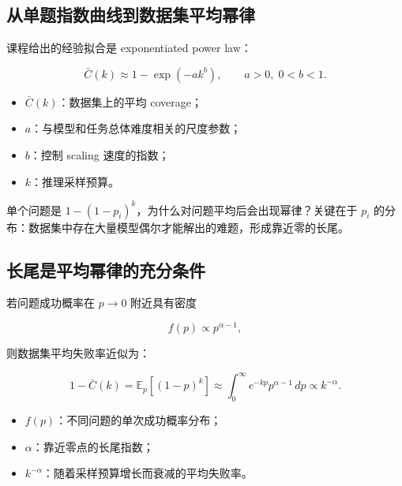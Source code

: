 \documentclass[a4paper]{article}
\begin{document}
\subsection{从单题指数曲线到数据集平均幂律}

课程给出的经验拟合是 exponentiated power law：

$$
\bar C(k)\approx 1-\exp(-a k^b),\qquad a>0,\;0<b<1.
$$

\begin{itemize}
    \item $\bar C(k)$：数据集上的平均 coverage；
    \item $a$：与模型和任务总体难度相关的尺度参数；
    \item $b$：控制 scaling 速度的指数；
    \item $k$：推理采样预算。
\end{itemize}


单个问题是 $1-(1-p_i)^k$，为什么对问题平均后会出现幂律？关键在于 $p_i$ 的分布：数据集中存在大量模型偶尔才能解出的难题，形成靠近零的长尾。


\subsection{长尾是平均幂律的充分条件}

若问题成功概率在 $p\rightarrow0$ 附近具有密度

$$
f(p)\propto p^{\alpha-1},
$$

则数据集平均失败率近似为：

$$
1-\bar C(k)=\mathbb{E}_{p}[(1-p)^k]
\approx\int_{0}^{\infty} e^{-kp}p^{\alpha-1}\,dp
\propto k^{-\alpha}.
$$

\begin{itemize}
    \item $f(p)$：不同问题的单次成功概率分布；
    \item $\alpha$：靠近零点的长尾指数；
    \item $k^{-\alpha}$：随着采样预算增长而衰减的平均失败率。
\end{itemize}

\end{document}
